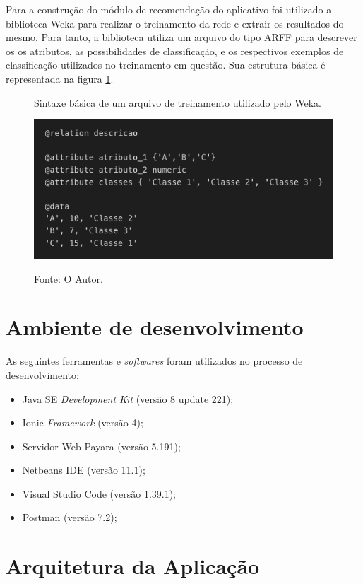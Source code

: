 Para a construção do módulo de recomendação do aplicativo foi utilizado a biblioteca Weka para realizar o treinamento da rede e extrair os resultados do mesmo. Para tanto, a biblioteca utiliza um arquivo do tipo ARFF para descrever os os atributos, as possibilidades de classificação, e os respectivos exemplos de classificação utilizados no treinamento em questão. Sua estrutura básica é representada na figura \ref{figura:arff}.

\begin{figure}[H]
	\caption{Sintaxe básica de um arquivo de treinamento utilizado pelo Weka.}
	\centering %
	\includegraphics[width=12cm]{resources/arff.png} %
	\label{figura:arff}
	\captionsetup{singlelinecheck = false, format= hang, justification=raggedright, labelsep=space, width=12cm}
	\caption*{\footnotesize Fonte: O Autor.}
\end{figure}

\section{Ambiente de desenvolvimento}

As seguintes ferramentas e \textit{softwares} foram utilizados no processo de desenvolvimento:

\begin{itemize}
    \item Java SE \textit{Development Kit} (versão 8 update 221);
    \item Ionic \textit{Framework} (versão 4);
    \item Servidor Web Payara (versão 5.191);
    \item Netbeans IDE (versão 11.1);
    \item Visual Studio Code (versão 1.39.1);
    \item Postman (versão 7.2);
\end{itemize}

\section{Arquitetura da Aplicação}

